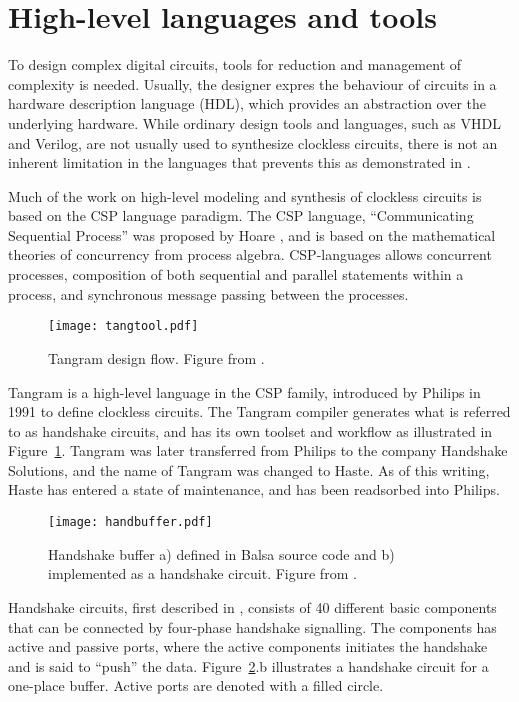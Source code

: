 \section{High-level languages and tools}
\label{sec:tools}

To design complex digital circuits, tools for reduction and management
of complexity is needed. Usually, the designer expres the behaviour of
circuits in a hardware description language (HDL), which provides an
abstraction over the underlying hardware. While ordinary design tools
and languages, such as VHDL and Verilog, are not usually used to
synthesize clockless circuits, there is not an inherent limitation in
the languages that prevents this as demonstrated in
\cite[pp. 135-137]{sparso}.

Much of the work on high-level modeling and synthesis of clockless
circuits is based on the CSP language paradigm. The CSP language,
``Communicating Sequential Process'' was proposed by Hoare \cite{csp},
and is based on the mathematical theories of concurrency from process
algebra. CSP-languages allows concurrent processes, composition of
both sequential and parallel statements within a process, and
synchronous message passing between the processes.

\begin{figure}[htbp]
  \centering
  \texttt{[image: tangtool.pdf]}
  \caption{Tangram design flow. Figure from \cite{fullscan}.}
  \label{fig:tangtool}
\end{figure}

Tangram is a high-level language in the CSP family, introduced by
Philips in 1991 to define clockless circuits. The Tangram compiler
generates what is referred to as handshake circuits, and has its own
toolset and workflow as illustrated in
Figure~\ref{fig:tangtool}. Tangram was later transferred from Philips
to the company Handshake Solutions, and the name of Tangram was
changed to Haste. As of this writing, Haste has entered a state of
maintenance, and has been readsorbed into Philips.

\begin{figure}[htbp]
  \centering
  \texttt{[image: handbuffer.pdf]}
  \caption{Handshake buffer a) defined in Balsa source code and b)
    implemented as a handshake circuit. Figure from
    \cite{taylor2008automatic}.}
  \label{fig:handbuffer}
\end{figure}

Handshake circuits, first described in \cite{12, teakxxx}, consists of
40 different basic components that can be connected by four-phase
handshake signalling. The components has active and passive ports,
where the active components initiates the handshake and is said to
``push'' the data. Figure~\ref{fig:handbuffer}.b illustrates a
handshake circuit for a one-place buffer. Active ports are denoted
with a filled circle.



